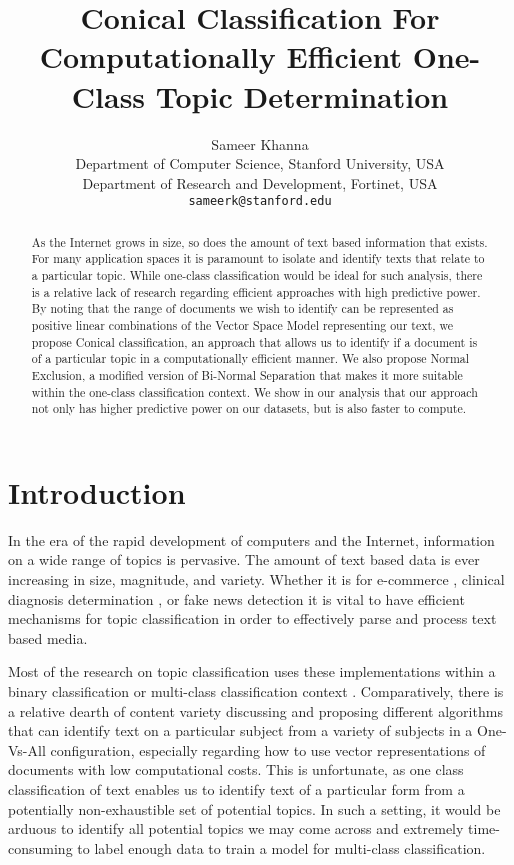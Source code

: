 \documentclass[11pt]{article}
\title{Conical Classification For Computationally Efficient One-Class Topic Determination}
\author{Sameer Khanna \\
  Department of Computer Science, Stanford University, USA \\
  Department of Research and Development, Fortinet, USA \\
  \texttt{sameerk@stanford.edu} \\
}
\begin{document}
\maketitle
\begin{abstract}
As the Internet grows in size, so does the amount of text based information that exists. For many application spaces it is paramount to isolate and identify texts that relate to a particular topic. While one-class classification would be ideal for such analysis, there is a relative lack of research regarding efficient approaches with high predictive power. By noting that the range of documents we wish to identify can be represented as positive linear combinations of the Vector Space Model representing our text, we propose Conical classification, an approach that allows us to identify if a document is of a particular topic in a computationally efficient manner. We also propose Normal Exclusion, a modified version of Bi-Normal Separation that makes it more suitable within the one-class classification context. We show in our analysis that our approach not only has higher predictive power on our datasets, but is also faster to compute.

\end{abstract}

\section{Introduction}

In the era of the rapid development of computers and the Internet, information on a wide range of topics is pervasive. The amount of text based data is ever increasing in size, magnitude, and variety. Whether it is for e-commerce \cite{Xiao_2021}, clinical diagnosis determination \cite{le2021machine}, or fake news detection \cite{ahmed2018detecting} it is vital to have efficient mechanisms for topic classification in order to effectively parse and process text based media.


Most of the research on topic classification uses these implementations within a binary classification or multi-class classification context \cite{trstenjak2014knn, zhang2011comparative, kim2019research, kim2019multi, liu2018research}. Comparatively, there is a relative dearth of content variety discussing and proposing different algorithms that can identify text on a particular subject from a variety of subjects in a One-Vs-All configuration, especially regarding how to use vector representations of documents with low computational costs. This is unfortunate, as one class classification of text enables us to identify text of a particular form from a potentially non-exhaustible set of potential topics. In such a setting, it would be arduous to identify all potential topics we may come across and extremely time-consuming to label enough data to train a model for multi-class classification.
\end{document}
